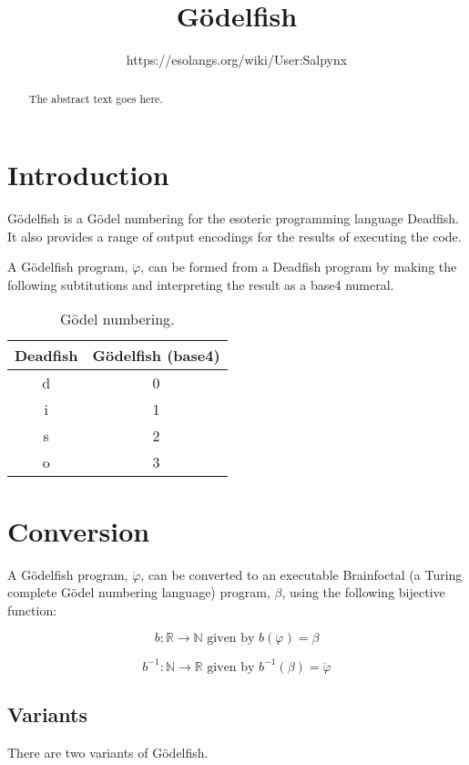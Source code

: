 \documentclass{article}
\begin{document}
\title{Gödelfish}
\author{https://esolangs.org/wiki/User:Salpynx}

\maketitle

\begin{abstract}
The abstract text goes here.
\end{abstract}

\section{Introduction}
Gödelfish is a Gödel numbering for the esoteric programming language Deadfish. It also provides a range of output encodings for the results of executing the code.

A Gödelfish program, $\ddot{\varphi}$, can be formed from a Deadfish program by making the following subtitutions and interpreting the result as a base4 numeral.

\begin{table}[h!]
  \begin{center}
    \caption{Gödel numbering.}
    \label{tab:table1}
    \begin{tabular}{c|c} %
      \textbf{Deadfish} & \textbf{Gödelfish (base4)} \\
      \hline
      d & 0\\
      i & 1\\
      s & 2\\
      o & 3\\
    \end{tabular}
  \end{center}
\end{table}

\section{Conversion}
A Gödelfish program, $\ddot{\varphi}$, can be converted to an executable Brainfoctal (a Turing complete Gödel numbering language) program, $\beta$, using the following bijective function:

\[
b:\mathbb{R} \to \mathbb{N} \text{ given by }
b(\ddot{\varphi}) = \beta
\]

\[
b^{-1}:\mathbb{N} \to \mathbb{R} \text{ given by }
b^{-1}(\beta) = \ddot{\varphi}
\]

\subsection{Variants}
There are two variants of Gödelfish.
\end{document}
